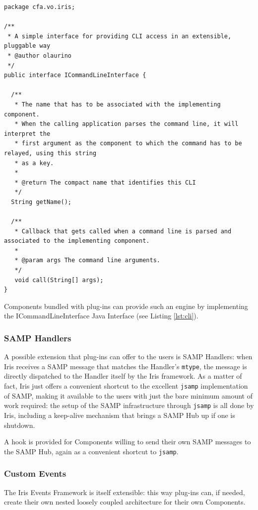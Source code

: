 \documentclass[final,5p,authoryear]{elsarticle}
\begin{document}
\begin{lstlisting}[style=java,
	caption={Every Iris component can expose a command line interface. Iris dispatches the command line arguments for the relative component to process.},
	label=lst:cli]
package cfa.vo.iris;

/**
 * A simple interface for providing CLI access in an extensible, pluggable way
 * @author olaurino
 */
public interface ICommandLineInterface {

  /**
   * The name that has to be associated with the implementing component.
   * When the calling application parses the command line, it will interpret the
   * first argument as the component to which the command has to be relayed, using this string
   * as a key.
   *
   * @return The compact name that identifies this CLI
   */
  String getName();

  /**
   * Callback that gets called when a command line is parsed and associated to the implementing component.
   *
   * @param args The command line arguments.
   */
   void call(String[] args);
}
\end{lstlisting}


Components bundled with plug-ins can provide such an engine by implementing the
ICommandLineInterface Java Interface (see Listing \ref{lst:cli}).

\subsubsection{SAMP Handlers} A possible extension that plug-ins can offer to
the users is SAMP Handlers: when Iris receives a SAMP message that matches the
Handler's \verb|mtype|, the message is directly dispatched to the Handler itself
by the Iris framework. As a matter of fact, Iris just offers a convenient
shortcut to the excellent \verb|jsamp| implementation of SAMP, making it
available to the users with just the bare minimum amount of work required: the
setup of the SAMP infrastructure through \verb|jsamp| is all done by Iris,
including a keep-alive mechanism that brings a SAMP Hub up if one is shutdown.

A hook is provided for Components willing to send their own SAMP messages to the
SAMP Hub, again as a convenient shortcut to \verb|jsamp|.

\subsubsection{Custom Events} The Iris Events Framework is itself extensible:
this way plug-ins can, if needed, create their own nested loosely coupled
architecture for their own Components.
\end{document}

